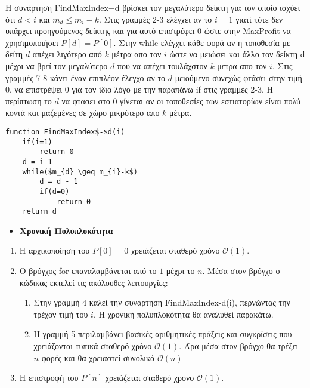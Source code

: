 \documentclass[a4paper,11pt]{article}
\begin{document}
\vspace{1cm}

Η συνάρτηση FindMaxIndex$-$d βρίσκει τον μεγαλύτερο δείκτη για τον οποίο ισχύει ότι $d<i$ και $m_{d} \leq m_{i}-k$. Στις γραμμές 2-3 ελέγχει αν το $i=1$ γιατί τότε δεν υπάρχει προηγούμενος δείκτης και για αυτό επιστρέφει $0$ ώστε στην MaxProfit να χρησιμοποιήσει $P[d]=P[0]$. Στην while ελέγχει κάθε φορά αν η τοποθεσία με δείτη $d$ απέχει λιγότερο από $k$ μέτρα απο τον $i$ ώστε να μειώσει και άλλο τον δείκτη d μέχρι να βρεί τον μεγαλύτερο $d$ που να απέχει τουλάχστον $k$ μετρα απο τον $i$. Στις γραμμές 7-8 κάνει έναν επιπλέον έλεγχο αν το $d$ μειούμενο συνεχώς φτάσει στην τιμή $0$, να επιστρέψει 
$0$ για τον ίδιο λόγο με την παραπάνω if στις γραμμές 2-3. Η περίπτωση το $d$ να φτασει στο $0$ γίνεται αν οι τοποθεσίες των εστιατορίων είναι πολύ κοντά και μαζεμένες σε χώρο μικρότερο απο $k$ μέτρα.

\begin{lstlisting}[mathescape]
function FindMaxIndex$-$d(i)
	if(i=1)
		return 0
	d = i-1
	while($m_{d} \geq m_{i}-k$)
		d = d - 1
		if(d=0)
			return 0
	return d
\end{lstlisting}

\begin{itemize}
\item \textbf{Χρονική Πολυπλοκότητα}
\end{itemize}
\begin{enumerate}
\item Η αρχικοποίηση του $P[0] = 0$ χρειάζεται σταθερό χρόνο $\mathcal{O}(1)$.
\item Ο βρόγχος for επαναλαμβάνεται από το $1$ μέχρι το $n$. Μέσα στον βρόγχο ο κώδικας εκτελεί τις ακόλουθες λειτουργίες:
\begin{enumerate}
\item Στην γραμμή $4$ καλεί την συνάρτηση FindMaxIndex-d(i), περνώντας την τρέχον τιμή του $i$. Η χρονική πολυπλοκότητα θα αναλυθεί παρακάτω.
\item Η γραμμή 5 περιλαμβάνει βασικές αριθμητικές πράξεις και συγκρίσεις που χρειάζονται τυπικά σταθερό χρόνο $\mathcal{O}(1)$. Άρα μέσα στον βρόγχο θα τρέξει $n$ φορές και θα χρειαστεί συνολικά $\mathcal{O}(n)$
\end{enumerate}
\item Η επιστροφή του $P[n]$ χρειάζεται σταθερό χρόνο $\mathcal{O}(1)$.
\end{enumerate}
\end{document}
